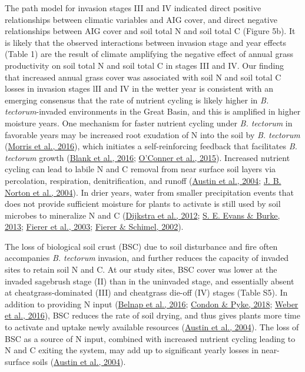 \documentclass[
  11pt,
  a4paper,
]{article}
\begin{document}
The path model for invasion stages III and IV indicated direct positive relationships between climatic variables and AIG cover, and direct negative relationships between AIG cover and soil total N and soil total C (Figure 5b). It is likely that the observed interactions between invasion stage and year effects (Table 1) are the result of climate amplifying the negative effect of annual grass productivity on soil total N and soil total C in stages III and IV. Our finding that increased annual grass cover was associated with soil N and soil total C losses in invasion stages lII and IV in the wetter year is consistent with an emerging consensus that the rate of nutrient cycling is likely higher in \emph{B. tectorum}-invaded environments in the Great Basin, and this is amplified in higher moisture years. One mechanism for faster nutrient cycling under \emph{B. tectorum} in favorable years may be increased root exudation of N into the soil by \emph{B. tectorum} (\protect\hyperlink{ref-Morris2016}{Morris et al., 2016}), which initiates a self-reinforcing feedback that facilitates \emph{B. tectorum} growth (\protect\hyperlink{ref-Blank2016}{Blank et al., 2016}; \protect\hyperlink{ref-OConner2015}{O'Conner et al., 2015}). Increased nutrient cycling can lead to labile N and C removal from near surface soil layers via percolation, respiration, denitrification, and runoff (\protect\hyperlink{ref-Austin2004}{Austin et al., 2004}; \protect\hyperlink{ref-Norton2004}{J. B. Norton et al., 2004}). In drier years, water from smaller precipitation events that does not provide sufficient moisture for plants to activate is still used by soil microbes to mineralize N and C (\protect\hyperlink{ref-Dijkstra2012}{Dijkstra et al., 2012}; \protect\hyperlink{ref-Evans2013}{S. E. Evans \& Burke, 2013}; \protect\hyperlink{ref-Fierer2003}{Fierer et al., 2003}; \protect\hyperlink{ref-Fierer2002}{Fierer \& Schimel, 2002}).

The loss of biological soil crust (BSC) due to soil disturbance and fire often accompanies \emph{B. tectorum} invasion, and further reduces the capacity of invaded sites to retain soil N and C. At our study sites, BSC cover was lower at the invaded sagebrush stage (II) than in the uninvaded stage, and essentially absent at cheatgrass-dominated (III) and cheatgrass die-off (IV) stages (Table S5). In addition to providing N input (\protect\hyperlink{ref-Belnap2016}{Belnap et al., 2016}; \protect\hyperlink{ref-Condon2018}{Condon \& Pyke, 2018}; \protect\hyperlink{ref-Weber2016}{Weber et al., 2016}), BSC reduces the rate of soil drying, and thus gives plants more time to activate and uptake newly available resources (\protect\hyperlink{ref-Austin2004}{Austin et al., 2004}). The loss of BSC as a source of N input, combined with increased nutrient cycling leading to N and C exiting the system, may add up to significant yearly losses in near-surface soils (\protect\hyperlink{ref-Austin2004}{Austin et al., 2004}).
\end{document}
